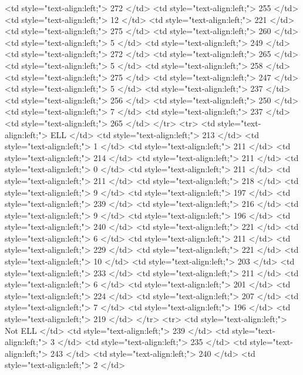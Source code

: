    <td style="text-align:left;"> 272 </td>
   <td style="text-align:left;"> 255 </td>
   <td style="text-align:left;"> 12 </td>
   <td style="text-align:left;"> 221 </td>
   <td style="text-align:left;"> 275 </td>
   <td style="text-align:left;"> 260 </td>
   <td style="text-align:left;"> 5 </td>
   <td style="text-align:left;"> 249 </td>
   <td style="text-align:left;"> 272 </td>
   <td style="text-align:left;"> 265 </td>
   <td style="text-align:left;"> 5 </td>
   <td style="text-align:left;"> 258 </td>
   <td style="text-align:left;"> 275 </td>
   <td style="text-align:left;"> 247 </td>
   <td style="text-align:left;"> 5 </td>
   <td style="text-align:left;"> 237 </td>
   <td style="text-align:left;"> 256 </td>
   <td style="text-align:left;"> 250 </td>
   <td style="text-align:left;"> 7 </td>
   <td style="text-align:left;"> 237 </td>
   <td style="text-align:left;"> 265 </td>
  </tr>
  <tr>
   <td style="text-align:left;"> ELL </td>
   <td style="text-align:left;"> 213 </td>
   <td style="text-align:left;"> 1 </td>
   <td style="text-align:left;"> 211 </td>
   <td style="text-align:left;"> 214 </td>
   <td style="text-align:left;"> 211 </td>
   <td style="text-align:left;"> 0 </td>
   <td style="text-align:left;"> 211 </td>
   <td style="text-align:left;"> 211 </td>
   <td style="text-align:left;"> 218 </td>
   <td style="text-align:left;"> 9 </td>
   <td style="text-align:left;"> 197 </td>
   <td style="text-align:left;"> 239 </td>
   <td style="text-align:left;"> 216 </td>
   <td style="text-align:left;"> 9 </td>
   <td style="text-align:left;"> 196 </td>
   <td style="text-align:left;"> 240 </td>
   <td style="text-align:left;"> 221 </td>
   <td style="text-align:left;"> 6 </td>
   <td style="text-align:left;"> 211 </td>
   <td style="text-align:left;"> 229 </td>
   <td style="text-align:left;"> 221 </td>
   <td style="text-align:left;"> 10 </td>
   <td style="text-align:left;"> 203 </td>
   <td style="text-align:left;"> 233 </td>
   <td style="text-align:left;"> 211 </td>
   <td style="text-align:left;"> 6 </td>
   <td style="text-align:left;"> 201 </td>
   <td style="text-align:left;"> 224 </td>
   <td style="text-align:left;"> 207 </td>
   <td style="text-align:left;"> 7 </td>
   <td style="text-align:left;"> 196 </td>
   <td style="text-align:left;"> 219 </td>
  </tr>
  <tr>
   <td style="text-align:left;"> Not ELL </td>
   <td style="text-align:left;"> 239 </td>
   <td style="text-align:left;"> 3 </td>
   <td style="text-align:left;"> 235 </td>
   <td style="text-align:left;"> 243 </td>
   <td style="text-align:left;"> 240 </td>
   <td style="text-align:left;"> 2 </td>
